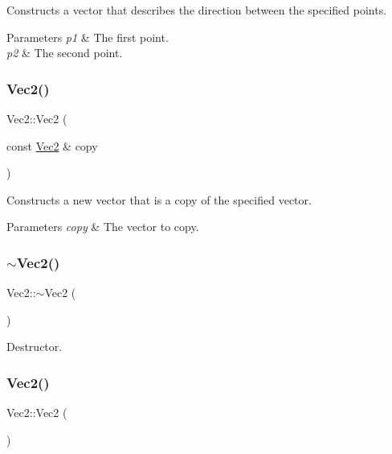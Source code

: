 Constructs a vector that describes the direction between the specified points.


\begin{DoxyParams}{Parameters}
{\em p1} & The first point. \\
\hline
{\em p2} & The second point. \\
\hline
\end{DoxyParams}
\mbox{\label{classVec2_a89f30fddf7a90a5bcd36a6a1064bc81f}} 
\subsubsection{\texorpdfstring{Vec2()}{Vec2()}\hspace{0.1cm}{\footnotesize\ttfamily [5/9]}}
{\footnotesize\ttfamily Vec2\+::\+Vec2 (\begin{DoxyParamCaption}\item[{const \hyperlink{classVec2}{Vec2} \&}]{copy }\end{DoxyParamCaption})\hspace{0.3cm}{\ttfamily [inline]}}

Constructs a new vector that is a copy of the specified vector.


\begin{DoxyParams}{Parameters}
{\em copy} & The vector to copy. \\
\hline
\end{DoxyParams}
\mbox{\label{classVec2_a13007f52587b4205f78ed6b1659f5eac}} 
\subsubsection{\texorpdfstring{$\sim$\+Vec2()}{~Vec2()}}
{\footnotesize\ttfamily Vec2\+::$\sim$\+Vec2 (\begin{DoxyParamCaption}{ }\end{DoxyParamCaption})\hspace{0.3cm}{\ttfamily [inline]}}

Destructor. \mbox{\label{classVec2_a76080feed7005893ecc634f903cfbae0}} 
\subsubsection{\texorpdfstring{Vec2()}{Vec2()}\hspace{0.1cm}{\footnotesize\ttfamily [6/9]}}
{\footnotesize\ttfamily Vec2\+::\+Vec2 (\begin{DoxyParamCaption}{ }\end{DoxyParamCaption})}


